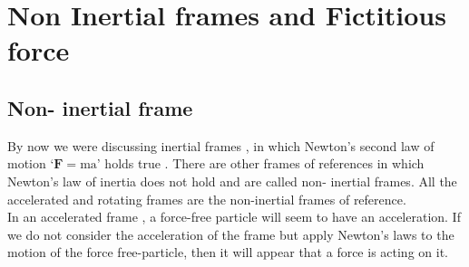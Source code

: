 \chapter{Non Inertial frames and Fictitious force}
\section{Non- inertial frame}
By now we were  discussing  inertial frames ,  in which Newton's second law of motion `$\boldsymbol{F}=\mathrm{ma}$'  holds true .
There are other frames of references in which Newton's law of  inertia does not hold and  are called non- inertial frames. All the accelerated and rotating frames are the non-inertial frames of reference.\\
In an accelerated frame ,  a force-free particle will seem to have an acceleration. If we do not consider the acceleration of the frame but apply Newton's laws to the motion of the force free-particle, then it will appear that a force is acting on it.
